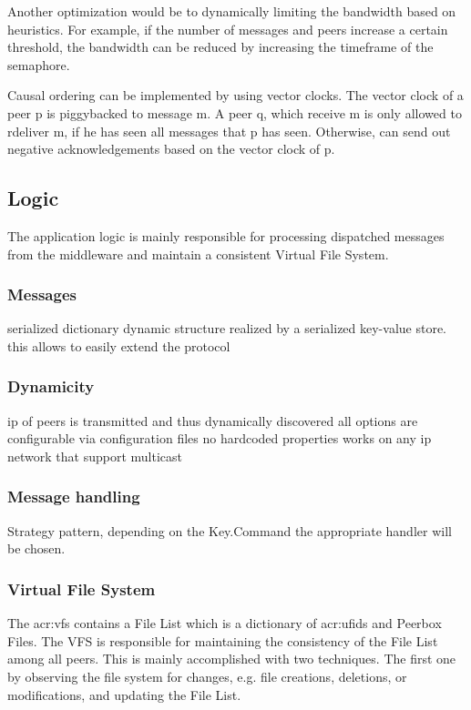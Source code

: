 Another optimization would be to dynamically limiting the bandwidth based on heuristics. For example, if the number of messages and peers increase a certain threshold, the bandwidth can be reduced by increasing the timeframe of the semaphore. 

Causal ordering can be implemented by using vector clocks. The vector clock of a peer p is piggybacked to message m. A peer q, which receive m is only allowed to rdeliver m, if he has seen all messages that p has seen. Otherwise, can send out negative acknowledgements based on the vector clock of p. 

\subsection{Logic}

The application logic is mainly responsible for processing dispatched messages from the middleware and maintain a consistent Virtual File System.
    
    \subsubsection{Messages}   
    serialized dictionary
    dynamic structure realized by a serialized key-value store. 
    this allows to easily extend the protocol

    \subsubsection{Dynamicity}
    ip of peers is transmitted and thus dynamically discovered
    all options are configurable via configuration files
    no hardcoded properties
    works on any ip network that support multicast
    
    
    \subsubsection{Message handling}
    Strategy pattern, depending on the Key.Command the appropriate handler will be chosen.
    
    \subsubsection{Virtual File System}
    
    The \gls{acr:vfs} contains a File List which is a dictionary of \glspl{acr:ufid} and Peerbox Files. The VFS is responsible for maintaining the consistency of the File List among all peers. This is mainly accomplished with two techniques. The first one by observing the file system for changes, e.g. file creations, deletions, or modifications, and updating the File List.
    
